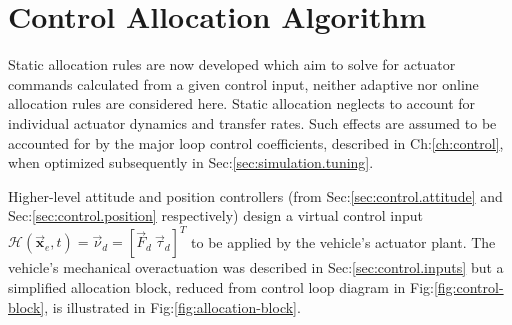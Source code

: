 \chapter{Control Allocation Algorithm}
\label{ch:allocation}
Static allocation rules are now developed which aim to solve for actuator commands calculated from a given control input, neither adaptive nor online allocation rules are considered here. Static allocation neglects to account for individual actuator dynamics and transfer rates. Such effects are assumed to be accounted for by the major loop control coefficients, described in Ch:\ref{ch:control}, when optimized subsequently in Sec:\ref{sec:simulation.tuning}.
\par
Higher-level attitude and position controllers (from Sec:\ref{sec:control.attitude} and Sec:\ref{sec:control.position} respectively) design a virtual control input $\mathcal{H}(\vec{\mathbf{x}}_e,t)=\vec{\nu}_d=[\vec{F}_d~\vec{\tau}_d]^T$ to be applied by the vehicle's actuator plant. The vehicle's mechanical overactuation was described in Sec:\ref{sec:control.inputs} but a simplified allocation block, reduced from control loop diagram in Fig:\ref{fig:control-block}, is illustrated in Fig:\ref{fig:allocation-block}.
